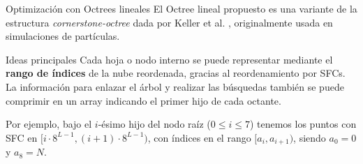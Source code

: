 \documentclass[aspectratio=169]{beamer}
\begin{document}
\begin{frame}{Optimización con Octrees lineales}
        El Octree lineal propuesto es una variante de la estructura \textit{cornerstone-octree} dada por Keller et al. \cite{Keller2023}, originalmente usada en simulaciones de partículas.
        \vspace{1em}
        \begin{block}{Ideas principales}
            \textrightarrow \: Cada hoja o nodo interno se puede representar mediante el \textbf{rango de índices} de la nube reordenada, gracias al reordenamiento por SFCs. \\
            \textrightarrow \: La información para enlazar el árbol y realizar las búsquedas también se puede comprimir en un array indicando el primer hijo de cada octante.
        \end{block} 

        \textbullet\: Por ejemplo, bajo el $i$-ésimo hijo del nodo raíz ($0 \leq i \leq 7$) tenemos los puntos con SFC en $[i\cdot 8^{L-1}, (i+1) \cdot 8^{L-1})$, con índices en el rango $[a_i, a_{i+1})$, siendo $a_0 = 0$ y $a_8 = N$.
\end{frame}
\end{document}
